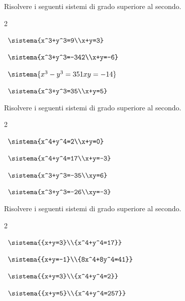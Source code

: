 \begin{esercizio}[*]
\label{ese:6.27}
Risolvere i seguenti sistemi di grado superiore al secondo.
\begin{htmulticols}{2}
\begin{enumeratea}
\item~\(\sistema{x^3+y^3=9\\x+y=3}\)
\item~\(\sistema{x^3+y^3=-342\\x+y=-6}\)

\item~\(\sistema{{x^3-y^3=351}{{xy}=-14}}\)
\item~\(\sistema{x^3+y^3=35\\x+y=5}\)
\end{enumeratea}
\end{htmulticols}
\end{esercizio}

\begin{esercizio}[*]
\label{ese:6.28}
Risolvere i seguenti sistemi di grado superiore al secondo.
\begin{htmulticols}{2}
\begin{enumeratea}
\item~\(\sistema{x^4+y^4=2\\x+y=0}\)
\item~\(\sistema{x^4+y^4=17\\x+y=-3}\)
\item~\(\sistema{x^3+y^3=-35\\xy=6}\)
\item~\(\sistema{x^3+y^3=-26\\xy=-3}\)
\end{enumeratea}
\end{htmulticols}
\end{esercizio}

\begin{esercizio}[*]
\label{ese:6.29}
Risolvere i seguenti sistemi di grado superiore al secondo.
\begin{htmulticols}{2}
\begin{enumeratea}
\item~\(\sistema{{x+y=3}\\{x^4+y^4=17}}\)

\item~\(\sistema{{x+y=-1}\\{8x^4+8y^4=41}}\)
\item~\(\sistema{{x+y=3}\\{x^4+y^4=2}}\)
\item~\(\sistema{{x+y=5}\\{x^4+y^4=257}}\)
\end{enumeratea}
\end{htmulticols}
\end{esercizio}

